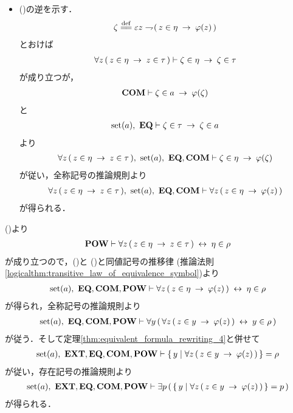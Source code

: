 \begin{sketch}
\begin{description}
\begin{itemize}
					\item ()の逆を示す．
						\begin{align}
							\zeta \defeq \varepsilon z \negation
							(\, z \in \eta \rarrow \varphi(z)\, )
						\end{align}
						とおけば
						\begin{align}
							\forall z\, (\, z \in \eta \hspace{0.25em}\rightarrow\hspace{0.25em} z \in \tau\, )
							\vdash \zeta \in \eta \hspace{0.25em}\rightarrow\hspace{0.25em} \zeta \in \tau
						\end{align}
						が成り立つが，
						\begin{align}
							\mbox{\bf COM} \vdash \zeta \in a \hspace{0.25em}\rightarrow\hspace{0.25em} \varphi(\zeta)
						\end{align}
						と
						\begin{align}
							\operatorname*{set} (a),\ \mbox{{\bf EQ}} \vdash \zeta \in \tau \hspace{0.25em}\rightarrow\hspace{0.25em} \zeta \in a
						\end{align}
						より
						\begin{align}
							\forall z\, (\, z \in \eta \rarrow z \in \tau\, ),\ 
							\set{a},\ \EQAX,\COMAX
							\vdash \zeta \in \eta \rarrow \varphi(\zeta)
						\end{align}
						が従い，全称記号の推論規則より
						\begin{align}
							\forall z\, (\, z \in \eta \rarrow z \in \tau\, ),\ 
							\set{a},\ \EQAX,\COMAX \vdash 
							\forall z\, (\, z \in \eta \rarrow \varphi(z)\, )
						\end{align}
						が得られる．
				\end{itemize}
				()より
				\begin{align}
					\mbox{{\bf POW}} \vdash \forall z\, (\, z \in \eta \hspace{0.25em}\rightarrow\hspace{0.25em} z \in \tau\, )
					\hspace{0.25em}\leftrightarrow\hspace{0.25em} \eta \in \rho
					\label{fom:power_of_a_set_is_a_set_5}
				\end{align}
				が成り立つので，()と
				()と同値記号の推移律
				(推論法則\ref{logicalthm:transitive_law_of_equivalence_symbol})より
				\begin{align}
					\operatorname*{set} (a),\ \mbox{{\bf EQ}},\mbox{\bf COM},\mbox{{\bf POW}} \vdash 
					\forall z\, (\, z \in \eta \hspace{0.25em}\rightarrow\hspace{0.25em} \varphi(z)\, ) \hspace{0.25em}\leftrightarrow\hspace{0.25em} \eta \in \rho
				\end{align}
				が得られ，全称記号の推論規則より
				\begin{align}
					\operatorname*{set} (a),\ \mbox{{\bf EQ}},\mbox{\bf COM},\mbox{{\bf POW}} \vdash 
					\forall y\, (\, \forall z\, (\, z \in y \hspace{0.25em}\rightarrow\hspace{0.25em} \varphi(z)\, ) \hspace{0.25em}\leftrightarrow\hspace{0.25em} y \in \rho\, )
				\end{align}
				が従う．そして定理\ref{thm:equivalent_formula_rewriting_4}と併せて
				\begin{align}
					\operatorname*{set} (a),\ \mbox{{\bf EXT}},\mbox{{\bf EQ}},\mbox{\bf COM},\mbox{{\bf POW}} \vdash 
					\left\{\, y \mid \forall z\, (\, z \in y \hspace{0.25em}\rightarrow\hspace{0.25em} \varphi(z)\, )\, \right\} = \rho
				\end{align}
				が従い，存在記号の推論規則より
				\begin{align}
					\operatorname*{set} (a),\ \mbox{{\bf EXT}},\mbox{{\bf EQ}},\mbox{\bf COM},\mbox{{\bf POW}} \vdash \exists p\, 
					(\, \left\{\, y \mid \forall z\, (\, z \in y \hspace{0.25em}\rightarrow\hspace{0.25em} \varphi(z)\, )\, \right\} = p\, )
				\end{align}
				が得られる．
				\QED
		\end{description}
	\end{sketch}